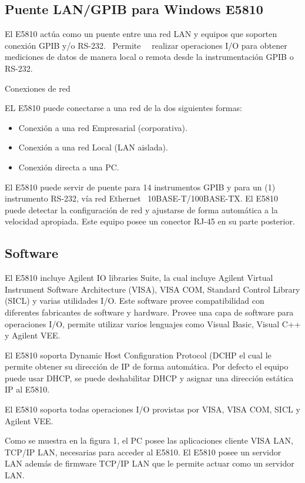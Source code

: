 \documentclass[paper=letter,oneside,fontsize=10pt,parskip=full]{article}
\begin{document}
\bigskip

\subsection{Puente LAN/GPIB para Windows E5810 }
El E5810 actúa como un puente entre una red LAN y equipos que soporten conexión GPIB y/o RS-232. \ Permite \ \ realizar
operaciones I/O para obtener mediciones de datos de manera local o remota desde la instrumentación GPIB o RS-232.

Conexiones de red

EL E5810 puede conectarse a una red de la dos siguientes formas: 

\begin{itemize}
\item Conexión a una red Empresarial (corporativa).
\item Conexión a una red Local (LAN aislada).
\item Conexión directa a una PC.
\end{itemize}
El E5810 puede servir de puente para 14 instrumentos GPIB y para un (1) instrumento RS-232, vía red Ethernet
\ 10BASE-T/100BASE-TX. El E5810 puede detectar la configuración de red y ajustarse de forma automática a la velocidad
apropiada. Este equipo posee un conector RJ-45 en su parte posterior. 

\subsection{Software }
El E5810 incluye Agilent IO libraries Suite, la cual incluye Agilent Virtual Instrument Software Architecture (VISA),
VISA COM, Standard Control Library (SICL) y varias utilidades I/O. Este software provee compatibilidad con diferentes
fabricantes de software y hardware. Provee una capa de software para operaciones I/O, permite utilizar varios lenguajes
como Visual Basic, Visual C++ y Agilent VEE.

El E5810 soporta Dynamic Host Configuration Protocol (DCHP el cual le permite obtener su dirección de IP de forma
automática. Por defecto el equipo puede usar DHCP, se puede deshabilitar DHCP y asignar una dirección estática IP al
E5810.

El E5810 soporta todas operaciones I/O provistas por VISA, VISA COM, SICL y Agilent VEE. 

Como se muestra en la figura 1, el PC posee las aplicaciones cliente VISA LAN, TCP/IP LAN, necesarias para acceder al
E5810. El E5810 posee un servidor LAN además de firmware TCP/IP LAN que le permite actuar como un servidor LAN.
\end{document}
